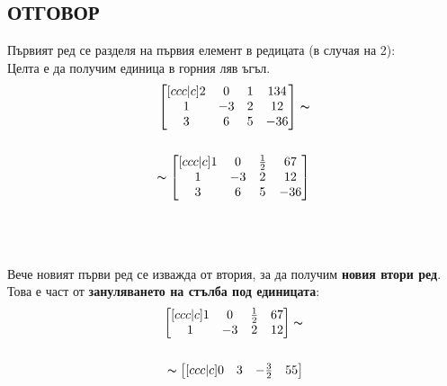 \documentclass[12pt, a4paper]{article}
\begin{document}
\begin{enumerate}
			\subsection{ОТГОВОР}
			{\color{blue!50!black}
				Първият ред се разделя на първия елемент в редицата (в случая на 2):\\
				Целта е да получим единица в горния ляв ъгъл.\\
				\begin{equation}
					\begin{split}
						\begin{bmatrix}[ccc|c]
							2 & 0 & 1 & 134 \\
							1 & -3 & 2 & 12 \\
							3 & 6 & 5 & -36 \\
						\end{bmatrix}\thicksim\\\\
						\thicksim
						\begin{bmatrix}[ccc|c]
							1 & 0 & \frac{1}{2} & 67 \\
							1 & -3 & 2 & 12 \\
							3 & 6 & 5 & -36 \\
						\end{bmatrix}\\\\\\
					\end{split}
				\end{equation}\\
				Вече новият първи ред се изважда от втория, за да получим \textbf{новия втори ред}.\\
				Това е част от \textbf{зануляването на стълба под единицата}:\\
				\begin{equation}
					\begin{split}
						\begin{bmatrix}[ccc|c]
							1 & 0 & \frac{1}{2} & 67 \\
							1 & -3 & 2 & 12 \\
						\end{bmatrix}\thicksim\\\\
						\thicksim
						\begin{bmatrix}[ccc|c]
							0 & 3 & -\frac{3}{2} & 55 \\
						\end{bmatrix}
					\end{split}
				\end{equation}\\
}
\end{enumerate}
\end{document}
